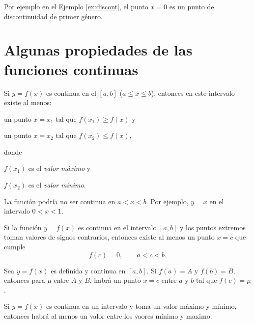 Por ejemplo en el Ejemplo \ref{ex:discont}, el punto \( x = 0 \) es un punto de discontinuidad de primer género.




\section{Algunas propiedades de las funciones continuas}

\begin{theorem}
  Si \( y = f(x) \) es continua en el \( [a, b] \) (\( a \le x \le b \)), entonces en este intervalo existe al menos:
  \begin{description}
  \item un punto \( x = x_1 \) tal que \( f(x_1) \ge f(x) \) y
  \item un punto \( x = x_2 \) tal que \( f(x_2) \le f(x) \),
  \end{description}
  donde
  \begin{description}
  \item \( f(x_1) \) es el \emph{valor máximo} y
  \item \( f(x_2) \) es el \emph{valor mínimo}.
  \end{description}
\end{theorem}




\begin{remark}
  La función podría no ser continua en \( a < x < b \). Por ejemplo, \( y = x \) en el intervalo \( 0 < x < 1 \).
\end{remark}


\begin{theorem}
  Si la función \( y = f(x) \) es continua en el intervalo \( [a, b] \) y los puntos extremos toman valores de signos contrarios, entonces existe al menos un punto \( x = c \) que cumple
  \[ f(c) = 0, \qquad a < c < b. \]
\end{theorem}




\begin{theorem}
  Sea \( y = f(x) \) es definida y continua en \( [a, b] \). Si \( f(a) = A \) y \( f(b) = B \), entonces para \( \mu \) entre \( A \) y \( B \), habrá un punto \( x = c \) entre \( a \) y \( b \) tal que \( f(c) = \mu \).
\end{theorem}




\begin{corollary}
  Si \( y = f(x) \) es continua en un intervalo y toma un valor máximo y mínimo, entonces habrá al menos un valor entre los vaores mínimo y maximo.
\end{corollary}


